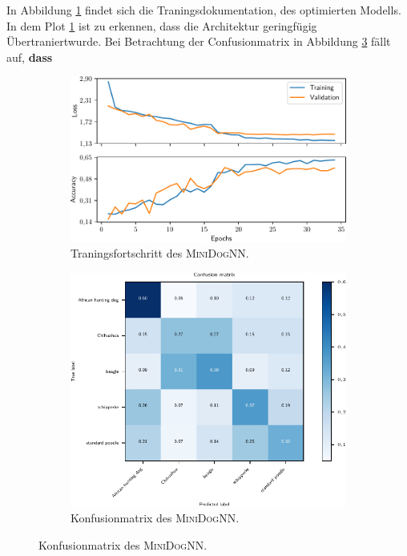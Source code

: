 In Abbildung \ref{fig:MiniDogNN_Loss_Acc} findet sich die Traningsdokumentation,
des optimierten Modells. In dem Plot \ref{fig:MiniDogNN_Loss_Acc} ist zu erkennen,
dass die Architektur geringfügig Übertraniertwurde.
Bei Betrachtung der Confusionmatrix in Abbildung \ref{fig:MiniDogNN_Konfusionmatrix} fällt auf, \textbf{dass}
\begin{figure}
\centering
\begin{subfigure}{0.48\textwidth}
\centering
\includegraphics[width = \textwidth]{../../final_data/MiniNN_n5/history.pdf}
\caption{Traningsfortschritt des \textsc{MiniDogNN}.}
\label{fig:MiniDogNN_Loss_Acc}
\end{subfigure}
\begin{subfigure}{0.48\textwidth}
\centering
\includegraphics[width = \textwidth]{../../final_data/MiniNN_n5/confusion_matrix.pdf}
\caption{Konfusionmatrix des \textsc{MiniDogNN}.}
\label{fig:MiniDogNN_Konfusionmatrix}
\end{subfigure}
\end{figure}

